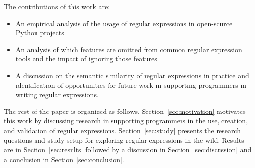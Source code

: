 The contributions of this work are:

\begin{itemize}
	\item An empirical analysis of the usage of regular expressions in  open-source Python projects
	\item An analysis of which features are omitted from common regular expression tools and the impact of ignoring those features
	\item A discussion on the semantic similarity of regular expressions in practice and identification of opportunities for future work in supporting programmers in writing regular expressions.
\end{itemize}

The rest of the paper is organized as follows. Section~\ref{sec:motivation} motivates this work by discussing research in supporting programmers in the use, creation, and validation of regular expressions. Section~\ref{sec:study} presents the research questions and study setup for exploring regular expressions in the wild. Results are in Section~\ref{sec:results} followed by a discussion in Section~\ref{sec:discussion} and a conclusion in Section~\ref{sec:conclusion}.

